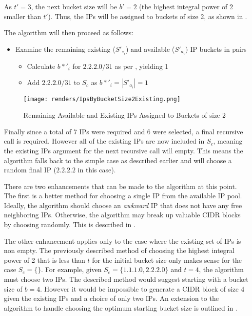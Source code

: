 As $t'=3$, the next bucket size will be $b' = 2$ (the highest integral power of 2 smaller than $t'$). Thus, the IPs will be assigned to buckets of size 2, as shown in .

The algorithm will then proceed as follows:
\begin{itemize}
\item{Examine the remaining existing ($S'_{e_i}$) and available ($S'_{a_i}$) IP buckets in pairs}
\begin{itemize}
\item{Calculate $b*'_i$ for $2.2.2.0/31$ as per , yielding 1}
\item{Add $2.2.2.0/31$ to $S_c$ as $b*'_i = |S'_{a_i}| = 1$} 
\end{itemize}
\end{itemize}

\begin{figure}[H]
      \centering
      \texttt{[image: renders/IpsByBucketSize2Existing.png]}
      \caption{Remaining Available and Existing IPs Assigned to Buckets of size 2}
      \label{fig:ipsByBucketExisting2}
\end{figure}

Finally since a total of 7 IPs were required and 6 were selected, a final recursive call is required. However all of the existing IPs are now included in $S_c$, meaning the existing IPs argument for the next recursive call will empty. This means the algorithm falls back to the simple case as described earlier and will choose a random final IP ($2.2.2.2$ in this case). 

There are two enhancements that can be made to the algorithm at this point. The first is a better method for choosing a single IP from the available IP pool. Ideally, the algorithm should choose an \textit{awkward} IP that does not have any free neighboring IPs. Otherwise, the algorithm may break up valuable CIDR blocks by choosing randomly. This is described in . 

The other enhancement applies only to the case where the existing set of IPs is non empty. The previously described method of choosing the highest integral power of 2 that is less than $t$ for the initial bucket size only makes sense for the case $S_e = \{\}$. For example, given $S_e = \{1.1.1.0, 2.2.2.0\}$ and $t = 4$, the algorithm must choose two IPs. The described method would suggest starting with a bucket size of $b=4$. However it would be impossible to generate a CIDR block of size 4 given the existing IPs and a choice of only two IPs. An extension to the algorithm to handle choosing the optimum starting bucket size is outlined in . 

